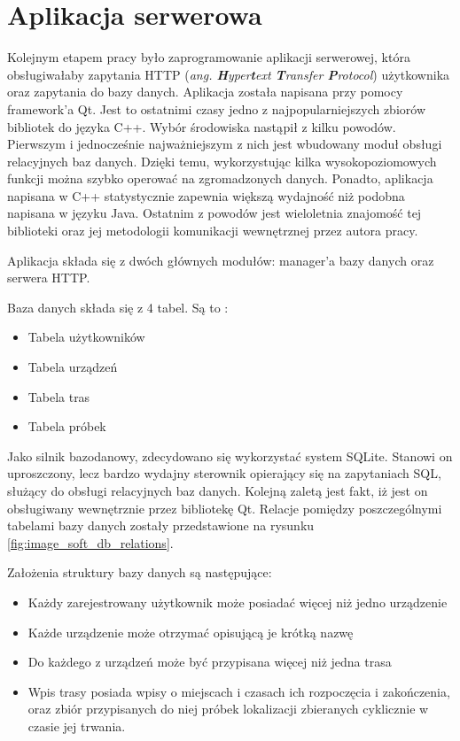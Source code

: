 \section{Aplikacja serwerowa}

Kolejnym etapem pracy było zaprogramowanie aplikacji serwerowej, która obsługiwałaby zapytania HTTP (\textit{ang. \textbf{H}yper\textbf{t}ext \textbf{T}ransfer \textbf{P}rotocol}) użytkownika oraz zapytania do bazy danych. Aplikacja została napisana przy pomocy framework'a Qt. Jest to ostatnimi czasy jedno z najpopularniejszych zbiorów bibliotek do języka C++. Wybór środowiska nastąpił z kilku powodów. Pierwszym i jednocześnie najważniejszym z nich jest wbudowany moduł obsługi relacyjnych baz danych. Dzięki temu, wykorzystując kilka wysokopoziomowych funkcji można szybko operować na zgromadzonych danych. Ponadto, aplikacja napisana w C++ statystycznie zapewnia większą wydajność niż podobna napisana w języku Java. Ostatnim z powodów jest wieloletnia znajomość tej biblioteki oraz jej metodologii komunikacji wewnętrznej przez autora pracy.

Aplikacja składa się z dwóch głównych modułów: manager'a bazy danych oraz serwera HTTP.

Baza danych składa się z 4 tabel. Są to :

\begin{itemize}
\item Tabela użytkowników
\item Tabela urządzeń
\item Tabela tras
\item Tabela próbek
\end{itemize}

Jako silnik bazodanowy, zdecydowano się wykorzystać system SQLite. Stanowi on uproszczony, lecz bardzo wydajny sterownik opierający się na zapytaniach SQL, służący do obsługi relacyjnych baz danych. Kolejną zaletą jest fakt, iż jest on obsługiwany wewnętrznie przez bibliotekę Qt.
Relacje pomiędzy poszczególnymi tabelami bazy danych zostały przedstawione na rysunku \ref{fig:image_soft_db_relations}.

Założenia struktury bazy danych są następujące:

\begin{itemize}
\item Każdy zarejestrowany użytkownik może posiadać więcej niż jedno urządzenie
\item Każde urządzenie może otrzymać opisującą je krótką nazwę
\item Do każdego z urządzeń może być przypisana więcej niż jedna trasa
\item Wpis trasy posiada wpisy o miejscach i czasach ich rozpoczęcia i zakończenia, oraz zbiór przypisanych do niej próbek lokalizacji zbieranych cyklicznie w czasie jej trwania.
\end{itemize}

